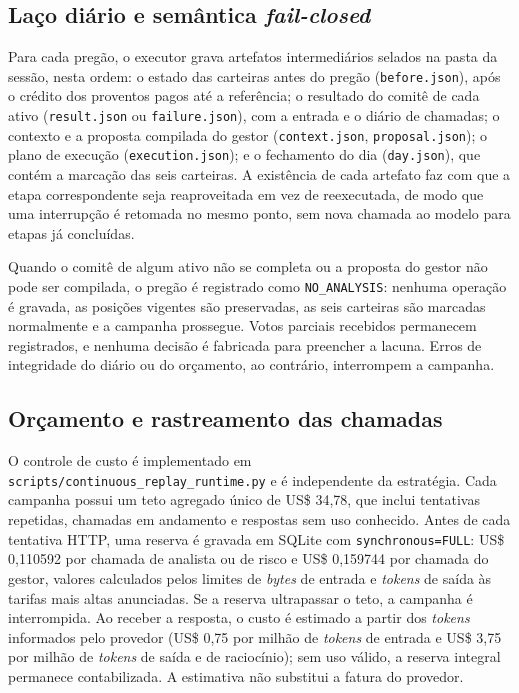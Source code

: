 \subsection{Laço diário e semântica \textit{fail-closed}}

Para cada pregão, o executor grava artefatos intermediários selados na pasta da sessão, nesta ordem: o estado das carteiras antes do pregão (\texttt{before.json}), após o crédito dos proventos pagos até a referência; o resultado do comitê de cada ativo (\texttt{result.json} ou \texttt{failure.json}), com a entrada e o diário de chamadas; o contexto e a proposta compilada do gestor (\texttt{context.json}, \texttt{proposal.json}); o plano de execução (\texttt{execution.json}); e o fechamento do dia (\texttt{day.json}), que contém a marcação das seis carteiras. A existência de cada artefato faz com que a etapa correspondente seja reaproveitada em vez de reexecutada, de modo que uma interrupção é retomada no mesmo ponto, sem nova chamada ao modelo para etapas já concluídas.

Quando o comitê de algum ativo não se completa ou a proposta do gestor não pode ser compilada, o pregão é registrado como \texttt{NO\_ANALYSIS}: nenhuma operação é gravada, as posições vigentes são preservadas, as seis carteiras são marcadas normalmente e a campanha prossegue. Votos parciais recebidos permanecem registrados, e nenhuma decisão é fabricada para preencher a lacuna. Erros de integridade do diário ou do orçamento, ao contrário, interrompem a campanha.

\subsection{Orçamento e rastreamento das chamadas}

O controle de custo é implementado em \texttt{scripts/continuous\_replay\_runtime.py} e é independente da estratégia. Cada campanha possui um teto agregado único de US\$ 34,78, que inclui tentativas repetidas, chamadas em andamento e respostas sem uso conhecido. Antes de cada tentativa HTTP, uma reserva é gravada em SQLite com \texttt{synchronous=FULL}: US\$ 0,110592 por chamada de analista ou de risco e US\$ 0,159744 por chamada do gestor, valores calculados pelos limites de \textit{bytes} de entrada e \textit{tokens} de saída às tarifas mais altas anunciadas. Se a reserva ultrapassar o teto, a campanha é interrompida. Ao receber a resposta, o custo é estimado a partir dos \textit{tokens} informados pelo provedor (US\$ 0,75 por milhão de \textit{tokens} de entrada e US\$ 3,75 por milhão de \textit{tokens} de saída e de raciocínio); sem uso válido, a reserva integral permanece contabilizada. A estimativa não substitui a fatura do provedor.


